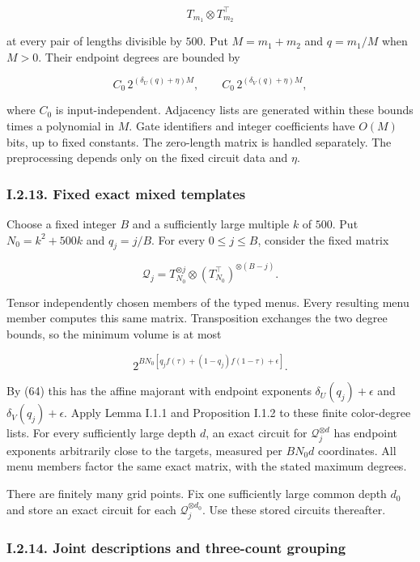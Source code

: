 \[
T_{m_1}\otimes T_{m_2}^{\top}
\]

at every pair of lengths divisible by \(500\). Put \(M=m_1+m_2\) and \(q=m_1/M\) when \(M>0\). Their endpoint degrees are bounded by

\[
C_0\,2^{(\delta_U(q)+\eta)M},\qquad
C_0\,2^{(\delta_V(q)+\eta)M},
\tag{65}
\]

where \(C_0\) is input-independent. Adjacency lists are generated within these bounds times a polynomial in \(M\). Gate identifiers and integer coefficients have \(O(M)\) bits, up to fixed constants. The zero-length matrix is handled separately. The preprocessing depends only on the fixed circuit data and \(\eta\).

\hypertarget{af-a9ec399514-i.2.13.-fixed-exact-mixed-templates}{%
\subsubsection{I.2.13. Fixed exact mixed templates}\label{af-a9ec399514-i.2.13.-fixed-exact-mixed-templates}}

Choose a fixed integer \(B\) and a sufficiently large multiple \(k\) of \(500\). Put \(N_0=k^2+500k\) and \(q_j=j/B\). For every \(0\le j\le B\), consider the fixed matrix

\[
\mathcal Q_j=T_{N_0}^{\otimes j}
\otimes(T_{N_0}^{\top})^{\otimes(B-j)}.
\]

Tensor independently chosen members of the typed menus. Every resulting menu member computes this same matrix. Transposition exchanges the two degree bounds, so the minimum volume is at most

\[
2^{BN_0[q_jf(\tau)+(1-q_j)f(1-\tau)+\epsilon]}.
\]

By (64) this has the affine majorant with endpoint exponents \(\delta_U(q_j)+\epsilon\) and \(\delta_V(q_j)+\epsilon\). Apply Lemma I.1.1 and Proposition I.1.2 to these finite color-degree lists. For every sufficiently large depth \(d\), an exact circuit for \(\mathcal Q_j^{\otimes d}\) has endpoint exponents arbitrarily close to the targets, measured per \(BN_0d\) coordinates. All menu members factor the same exact matrix, with the stated maximum degrees.

There are finitely many grid points. Fix one sufficiently large common depth \(d_0\) and store an exact circuit for each \(\mathcal Q_j^{\otimes d_0}\). Use these stored circuits thereafter.

\hypertarget{af-a9ec399514-i.2.14.-joint-descriptions-and-three-count-grouping}{%
\subsubsection{I.2.14. Joint descriptions and three-count grouping}\label{af-a9ec399514-i.2.14.-joint-descriptions-and-three-count-grouping}}

